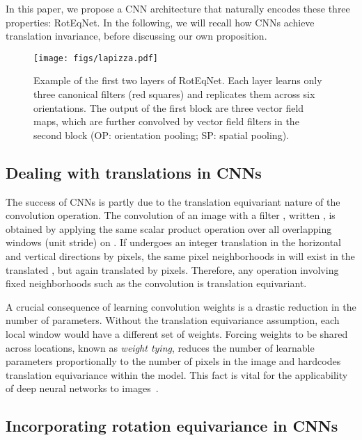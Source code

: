 \documentclass[10pt,twocolumn,letterpaper,table]{article}
\begin{document}
In this paper, we propose a CNN architecture that naturally encodes these three properties: RotEqNet.
In the following, we will recall how CNNs achieve translation invariance, before discussing our own proposition.

\begin{figure*}[!t]
\centering
\texttt{[image: figs/lapizza.pdf]}
\vspace*{-2mm}
\caption{Example of the first two layers of RotEqNet. Each layer learns only three canonical filters (red squares) and replicates them across six orientations. The output of the first block are three vector field maps, which are further convolved by vector field filters in the second block (OP: orientation pooling; SP: spatial pooling).}
\label{fig:layer1}
\vspace*{-4mm}
\end{figure*}

\subsection{Dealing with translations in CNNs}

The success of CNNs is partly due to the translation equivariant nature of the convolution operation. 
The convolution of an image  with a filter , written , is obtained by applying the same scalar product operation over all overlapping  windows (unit stride) on . If  undergoes an integer translation in the horizontal and vertical directions by  pixels, the same pixel neighborhoods in  will exist in the translated , but again translated by  pixels. Therefore, any operation involving fixed neighborhoods
such as the convolution is translation equivariant.

A crucial consequence of learning convolution weights is a drastic reduction in the number of parameters. Without the translation equivariance assumption, each local window would have a different set of weights.
Forcing weights to be shared across locations, known as \emph{weight tying}, reduces the number of learnable parameters proportionally to the number of pixels in the image and hardcodes translation equivariance within the model. This fact is vital for the applicability of deep neural networks to images~\cite{le1990handwritten}.

\subsection{Incorporating rotation equivariance in CNNs} \label{sec:expDim}
    
\end{document}
